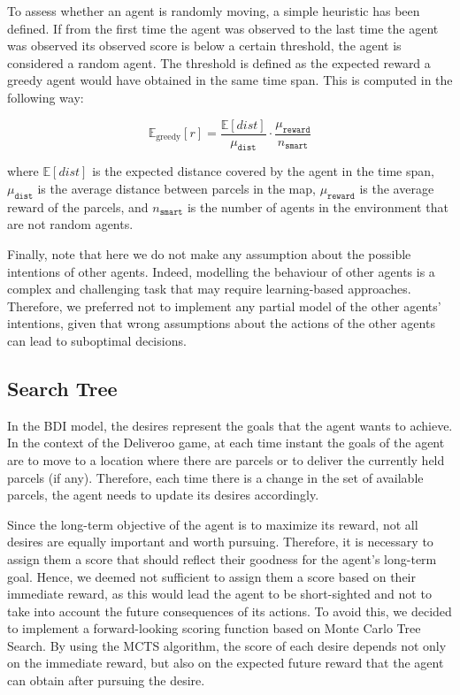 To assess whether an agent is randomly moving, a simple heuristic has been defined. If from the first time the agent was observed to the last time the agent was observed its observed score is below a certain threshold, the agent is considered a random agent. The threshold is defined as the expected reward a greedy agent would have obtained in the same time span. This is computed in the following way:

\begin{equation*}
    \mathbb{E}_{\text{greedy}}[r] = \frac{\mathbb{E}[dist]}{\mu_{\texttt{dist}}} \cdot \frac{\mu_{\texttt{reward}}}{n_{\texttt{smart}}}
\end{equation*}

where $\mathbb{E}[dist]$ is the expected distance covered by the agent in the time span, $\mu_{\texttt{dist}}$ is the average distance between parcels in the map, $\mu_{\texttt{reward}}$ is the average reward of the parcels, and $n_{\texttt{smart}}$ is the number of agents in the environment that are not random agents.

Finally, note that here we do not make any assumption about the possible intentions of other agents. Indeed, modelling the behaviour of other agents is a complex and challenging task that may require learning-based approaches. Therefore, we preferred not to implement any partial model of the other agents' intentions, given that wrong assumptions about the actions of the other agents can lead to suboptimal decisions.


\subsection{Search Tree}
\label{sec:search}

In the BDI model, the desires represent the goals that the agent wants to achieve. In the context of the Deliveroo game, at each time instant the goals of the agent are to move to a location where there are parcels or to deliver the currently held parcels (if any). Therefore, each time there is a change in the set of available parcels, the agent needs to update its desires accordingly.

Since the long-term objective of the agent is to maximize its reward, not all desires are equally important and worth pursuing. Therefore, it is necessary to assign them a score that should reflect their goodness for the agent's long-term goal. Hence, we deemed not sufficient to assign them a score based on their immediate reward, as this would lead the agent to be short-sighted and not to take into account the future consequences of its actions. To avoid this, we decided to implement a forward-looking scoring function based on Monte Carlo Tree Search. By using the MCTS algorithm, the score of each desire depends not only on the immediate reward, but also on the expected future reward that the agent can obtain after pursuing the desire.

